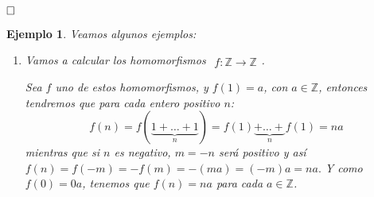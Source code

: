 \documentclass[12pt]{article}
\newtheorem{example}{Ejemplo}[theorem]
\begin{document}
$\hfill \square$

\begin{example}Veamos algunos ejemplos:
\begin{enumerate}
\item Vamos a calcular los homomorfismos $
\begin{array}{rccl}
f\colon \mathbb{Z} \longrightarrow  \mathbb{Z}
\end{array}
$.

Sea $f$ uno de estos homomorfismos, y $f(1) = a$, con $a\in \mathbb{Z}$, entonces tendremos que para cada entero positivo $n$: $$f(n) = f(\underbrace{1+\ldots+1}_n) = f(1)\underbrace{ + \ldots + }_n f(1) = na$$
mientras que si $n$ es negativo, $m = -n$ será positivo y así $f(n) = f(-m) = -f(m) = -(ma) = (-m)a = na.$ Y como $f(0) = 0a$, tenemos que $f(n) = na$ para cada $a\in \mathbb{Z}$.


\end{enumerate}
\end{example}
\end{document}
